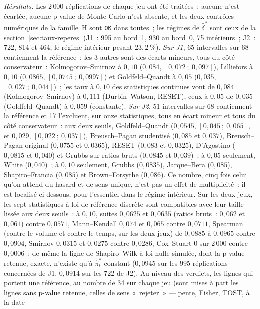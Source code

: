 \documentclass[a4paper,11pt]{article}
\newcommand{\code}[1]{\texttt{\small #1}}
\begin{document}
\emph{Résultats.} Les $2\,000$ réplications de chaque jeu ont été traitées~: aucune n'est
écartée, aucune p-value de Monte-Carlo n'est absente, et les deux contrôles numériques de la
famille~H sont \code{OK} dans toutes~; les régimes de $\hat\delta^{*}$ sont ceux de la
section~\ref{sec:taux-reperes} (J1~: 995 au bord~1, 930 au bord~0, 75 intérieurs~; J2~: 722,
814 et 464, le régime intérieur pesant $23{,}2~\%$). \emph{Sur J1}, 65 intervalles sur 68
contiennent la référence~; les 3 autres sont des écarts mineurs, tous du côté conservateur~:
Kolmogorov--Smirnov à $0{,}10$ ($0{,}084$, $[0{,}072~;~0{,}097]$), Lilliefors à $0{,}10$
($0{,}0865$, $[0{,}0745~;~0{,}0997]$) et Goldfeld--Quandt à $0{,}05$ ($0{,}035$,
$[0{,}027~;~0{,}044]$)~; les taux à $0{,}10$ des statistiques continues vont de $0{,}084$
(Kolmogorov--Smirnov) à $0{,}111$ (Durbin--Watson, RESET), ceux à $0{,}05$ de $0{,}035$
(Goldfeld--Quandt) à $0{,}059$ (constante). \emph{Sur J2}, 51 intervalles sur 68 contiennent la
référence et 17 l'excluent, sur onze statistiques, tous en écart mineur et tous du côté
conservateur~: aux deux seuils, Goldfeld--Quandt ($0{,}0545$, $[0{,}045~;~0{,}065]$, et
$0{,}029$, $[0{,}022~;~0{,}037]$), Breusch--Pagan studentisé ($0{,}085$ et $0{,}037$),
Breusch--Pagan original ($0{,}0755$ et $0{,}0365$), RESET ($0{,}083$ et $0{,}0325$),
D'Agostino ($0{,}0815$ et $0{,}040$) et Grubbs sur ratios bruts ($0{,}0845$ et $0{,}039$)~; à
$0{,}05$ seulement, White ($0{,}040$)~; à $0{,}10$ seulement, Grubbs ($0{,}0835$), Jarque--Bera
($0{,}085$), Shapiro--Francia ($0{,}085$) et Brown--Forsythe ($0{,}086$). Ce nombre, cinq fois
celui qu'on attend du hasard et de sens unique, n'est pas un effet de multiplicité~: il est
localisé ci-dessous, pour l'essentiel dans le régime intérieur. Sur les deux jeux, les sept
statistiques à loi de référence discrète sont compatibles avec leur taille lissée aux deux
seuils~: à $0{,}10$, suites $0{,}0625$ et $0{,}0635$ (ratios bruts~: $0{,}062$ et $0{,}061$)
contre $0{,}0571$, Mann--Kendall $0{,}074$ et $0{,}065$ contre $0{,}0711$, Spearman (contre le volume et contre le temps, sur les deux jeux) de
$0{,}0885$ à $0{,}0965$ contre $0{,}0904$, Smirnov $0{,}0315$ et $0{,}0275$ contre $0{,}0286$,
Cox--Stuart 0 sur $2\,000$ contre $0{,}0006$~; de même la ligne de Shapiro--Wilk à loi nulle
simulée, dont la p-value retenue, exacte, n'existe qu'à $\hat\pi^{*}_t$ constant ($0{,}0945$
sur les 995 réplications concernées de J1, $0{,}0914$ sur les 722 de J2). Au niveau des
verdicts, les lignes qui portent une référence, au nombre de 34 sur chaque jeu (sont mises à
part les lignes sans p-value retenue, celles de sens «~rejeter~» --- pente, Fisher, TOST, à la date
\end{document}
